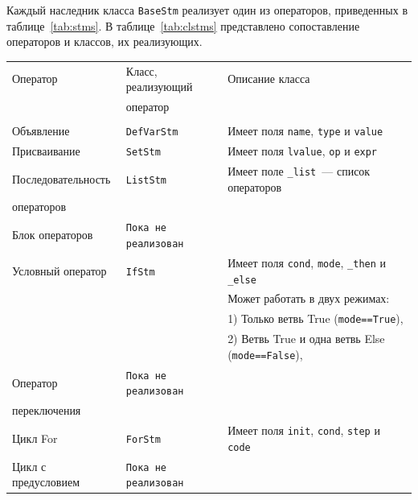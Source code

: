 Каждый наследник класса \verb"BaseStm" реализует один из операторов, приведенных в таблице~\ref{tab:stms}. В таблице~\ref{tab:clstms} представлено сопоставление операторов и классов, их реализующих.
\begin{table}
    \begin{center}
        \begin{tabular}{|l|l|l|}
            \hline
            Оператор & Класс, реализующий                   & Описание класса\\
                     & оператор                             &\\
                                                           &&\\         
            \hline
            Объявление & \verb"DefVarStm"                   &Имеет поля \verb"name", \verb"type" и \verb"value"\\
            \hline
            Присваивание & \verb"SetStm"                    &Имеет поля \verb"lvalue", \verb"op" и \verb"expr"\\
            \hline
            Последовательность & \verb"ListStm"             &Имеет поле \verb"_list"~--- список операторов\\
            операторов         &                            &\\
            \hline
            Блок операторов &\verb"Пока не реализован"      &\\
            \hline
            Условный оператор & \verb"IfStm"                &Имеет поля \verb"cond", \verb"mode", \verb"_then" и \verb"_else"\\
                                                           &&Может работать в двух режимах: \\         
                                                           &&1) Только ветвь True (\verb"mode==True"),   \\         
                                                           &&2) Ветвь True и одна ветвь Else (\verb"mode==False"),   \\         
            \hline
            Оператор     & \verb"Пока не реализован"        &\\
            переключения &                                  &\\
            \hline
            Цикл For & \verb"ForStm"                        &Имеет поля \verb"init", \verb"cond", \verb"step" и \verb"code"\\
            \hline
            Цикл с предусловием & \verb"Пока не реализован" &\\

\end{tabular}
\end{center}
\end{table}
